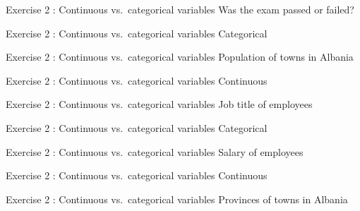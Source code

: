 \documentclass[
  ignorenonframetext,
]{beamer}
\begin{document}
\begin{frame}{Exercise 2 : Continuous vs.~categorical variables}
\label{exercise-2-continuous-vs.-categorical-variables}
Was the exam passed or failed?
\end{frame}

\begin{frame}{Exercise 2 : Continuous vs.~categorical variables}
\label{exercise-2-continuous-vs.-categorical-variables-1}
Categorical
\end{frame}

\begin{frame}{Exercise 2 : Continuous vs.~categorical variables}
\label{exercise-2-continuous-vs.-categorical-variables-2}
Population of towns in Albania
\end{frame}

\begin{frame}{Exercise 2 : Continuous vs.~categorical variables}
\label{exercise-2-continuous-vs.-categorical-variables-3}
Continuous
\end{frame}

\begin{frame}{Exercise 2 : Continuous vs.~categorical variables}
\label{exercise-2-continuous-vs.-categorical-variables-4}
Job title of employees
\end{frame}

\begin{frame}{Exercise 2 : Continuous vs.~categorical variables}
\label{exercise-2-continuous-vs.-categorical-variables-5}
Categorical
\end{frame}

\begin{frame}{Exercise 2 : Continuous vs.~categorical variables}
\label{exercise-2-continuous-vs.-categorical-variables-6}
Salary of employees
\end{frame}

\begin{frame}{Exercise 2 : Continuous vs.~categorical variables}
\label{exercise-2-continuous-vs.-categorical-variables-7}
Continuous
\end{frame}

\begin{frame}{Exercise 2 : Continuous vs.~categorical variables}
\label{exercise-2-continuous-vs.-categorical-variables-8}
Provinces of towns in Albania
\end{frame}
\end{document}
